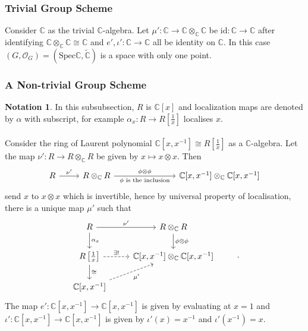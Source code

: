 \documentclass{article}
\theoremstyle{definition}
\newtheorem*{notation}{Notation}
\newcommand{\Spec}{\mathrm{Spec}}
\newcommand{\ssheaf}[1]{\widetilde{#1}}
\newcommand{\tensorC}[2]{#1\otimes_\mathbb C #2}
\newcommand{\tensor}[2]{#1\otimes#2}
\newcommand{\so}[1]{(#1, \mathcal O_{#1})}
\newcommand{\id}{\mathrm{id}}
\newcommand{\sr}[1]{(\Spec{#1},\ssheaf{#1})}
\begin{document}
\subsubsection{Trivial Group Scheme}
Consider $\mathbb C$ as the trivial $\mathbb C$-algebra. Let $\mu': \mathbb C\to\tensorC{\mathbb C}{\mathbb C}$ be $\id:\mathbb C\to\mathbb C$ after identifying $\tensorC{\mathbb C}{\mathbb C}\cong\mathbb C$ and $e',\iota':\mathbb C\to\mathbb C$ all be identity on $\mathbb C$. In this case $\so G=\sr{\mathbb C}$ is a space with only one point.

\subsubsection{A Non-trivial Group Scheme}
\begin{notation}
In this subsubsection, $R$ is $\mathbb C[x]$ and localization maps are denoted by $\alpha$ with subscript, for example $\alpha_x : R\to R\left[\frac1x\right]$ localises $x$.
\end{notation}
\paragraph{} Consider the ring of Laurent polynomial $\mathbb C[x,x^{-1}]\cong R\left[\frac1x\right]$ as a $\mathbb C$-algebra. Let the map $\nu':R\to\tensorC R R$ be given by $x\mapsto \tensor x x$. Then 
\begin{equation*}
\begin{tikzcd}
R\arrow[r, "\nu'"] & \tensorC R R \arrow[r, "\tensor\phi\phi", "\phi\text{ is the inclusion}"'] %
&[5em] \tensorC{\mathbb C[x,x^{-1}]}{\mathbb C[x, x^{-1}]}
\end{tikzcd}
\end{equation*}
send $x$ to $\tensor x x$ which is invertible, hence by universal property of localisation, there is a unique map $\mu'$ such that
\begin{equation*}
\begin{tikzcd}
R\arrow[r, "\nu'"]\arrow[d, "\alpha_x"] & \tensorC R R\arrow[d, "\tensor \phi \phi"] & \\
R\left[\frac1x\right]\arrow[r, dashed, "\exists!"]\arrow[d, "\cong"] & \tensorC{\mathbb C[x,x^{-1}]}{\mathbb C[x, x^{-1}]} \\
\mathbb C[x, x^{-1}]\arrow[ru, dashed, "\mu'"']
\end{tikzcd}.
\end{equation*}
The map $e':\mathbb C[x,x^{-1}]\to\mathbb C[x,x^{-1}]$ is given by evaluating at $x=1$ and $\iota': \mathbb C[x,x^{-1}]\to\mathbb C[x,x^{-1}]$ is given by $\iota'(x)=x^{-1}$ and $\iota'(x^{-1})=x$. 
\end{document}
